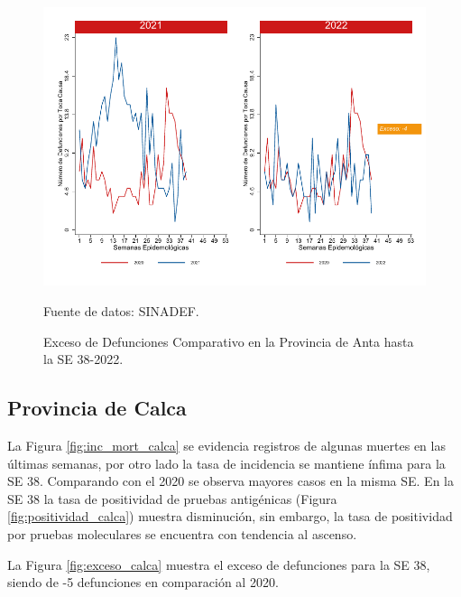 \documentclass[12pt,a4paper,openany]{book}
\begin{document}
	\begin{figure}[h]
		\caption{Exceso de Defunciones Comparativo en la Provincia de Anta hasta la SE 38-2022.}\label{fig:exceso_anta}
		\begin{center}
			\includegraphics[width=0.7\linewidth]{../figuras/exceso_2.pdf}
		\end{center}
		{\footnotesize {Fuente de datos: SINADEF.}}
	\end{figure}
	
	\clearpage
	
	\subsection*{Provincia de Calca}
	\noindent La Figura \ref{fig:inc_mort_calca} se evidencia registros de algunas muertes en las últimas semanas, por otro lado la tasa de incidencia se mantiene ínfima para la SE 38. Comparando con el 2020 se observa mayores casos en la misma SE. En la SE 38 la tasa de positividad de pruebas antigénicas (Figura \ref{fig:positividad_calca}) muestra disminución, sin embargo, la tasa de positividad por pruebas moleculares se encuentra con tendencia al ascenso.
	
	La Figura \ref{fig:exceso_calca} muestra el exceso de defunciones para la SE 38, siendo de -5 defunciones en comparación al 2020.
	
\end{document}
